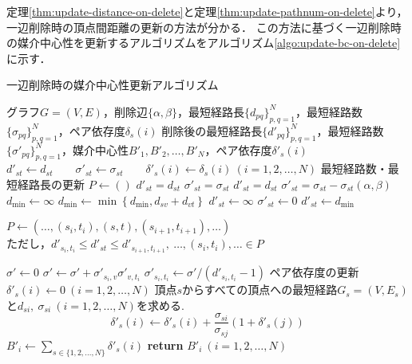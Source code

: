 定理\ref{thm:update-distance-on-delete}と定理\ref{thm:update-pathnum-on-delete}より，一辺削除時の頂点間距離の更新の方法が分かる．
この方法に基づく一辺削除時の媒介中心性を更新するアルゴリズムをアルゴリズム\ref{algo:update-bc-on-delete}に示す．

\begin{algorithm}[H]
  \caption{一辺削除時の媒介中心性更新アルゴリズム}
  \label{algo:update-bc-on-delete}
  \begin{algorithmic}[1]
    \Require グラフ$G=(V,E)$，削除辺$\{\alpha,\beta\}$，最短経路長$\{d_{pq}\}_{p,q=1}^N$，最短経路数$\{\sigma_{pq}\}_{p,q=1}^N$，ペア依存度$\delta_s(i)$
    \Ensure 削除後の最短経路長$\{d'_{pq}\}_{p,q=1}^N$，最短経路数$\{\sigma'_{pq}\}_{p,q=1}^N$，媒介中心性$B'_1,B'_2,\ldots,B'_N$，ペア依存度$\delta'_s(i)$
    \State $d'_{st}\gets d_{st}\qquad\sigma'_{st}\gets\sigma_{st}\qquad\delta'_s(i)\gets\delta_s(i)\ (i=1,2,\ldots,N)$
    \Else
    \State\Comment 最短経路数・最短経路長の更新
    \State $P\gets()$
    \State $d'_{st}=d_{st}$
    \State $\sigma'_{st}=\sigma_{st}$
    \State $d'_{st}=d_{st}$
    \State $\sigma'_{st}=\sigma_{st}-\sigma_{st}(\alpha,\beta)$
    \State $d_{\min}\gets \infty$
    \State $d_{\min}\gets\min\left\{d_{\min},d_{sv}+d_{vt}\right\}$
    \EndFor
    \State $d'_{st}\gets\infty$
    \State $\sigma'_{st}\gets0$
    \Else
    \State $d'_{st}\gets d_{\min}$
    \State \parbox[t]{\linewidth}{
      $P\gets(\ldots,(s_i,t_i),(s,t),(s_{i+1},t_{i+1}),\ldots)$ \\
      ただし，$d'_{s_i,t_i}\leq d'_{st}\leq d'_{s_{i+1},t_{i+1}},\ \ldots,(s_i,t_i),\ldots\in P$
    }
    \EndIf
    \EndIf
    \EndFor
    \State $\sigma'\gets0$
    \State $\sigma'\gets\sigma'+\sigma'_{s_i,v}\sigma'_{v,t_i}$
    \EndFor
    \State $\sigma'_{s_i,t_i}\gets\sigma'/(d'_{s_i,t_i}-1)$
    \EndFor
    \State\Comment ペア依存度の更新
    \State $\delta'_s(i)\gets0\ (i=1,2,\ldots,N)$
    \State 頂点$s$からすべての頂点への最短経路$G_s=(V,E_s)$と$d_{si},\ \sigma_{si}\ (i=1,2,\ldots,N)$を求める. 
    \State \begin{equation*} \delta'_s(i)\gets\delta'_s(i)+\frac{\sigma_{si}}{\sigma_{sj}}(1+\delta'_s(j)) \end{equation*}
    \EndFor
    \EndIf
    \EndFor
    \State $B'_i\gets\sum_{s\in\{1,2,\ldots,N\}}\delta'_s(i)$
    \State \textbf{return} $B'_i\ (i=1,2,\ldots,N)$
  \end{algorithmic}
\end{algorithm}

